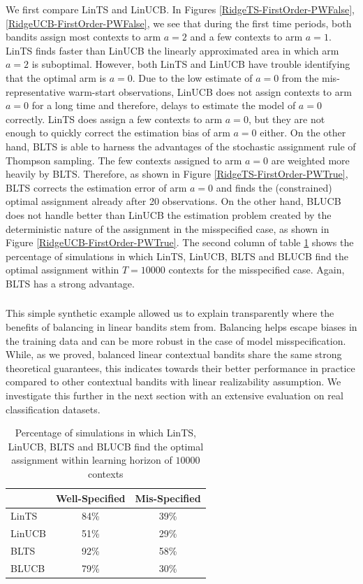 \documentclass[letterpaper]{article} %
\begin{document}
We first compare LinTS and LinUCB.
In Figures \ref{RidgeTS-FirstOrder-PWFalse}, \ref{RidgeUCB-FirstOrder-PWFalse}, we see that during the first time periods, both bandits assign most contexts to arm $a = 2$ and a few contexts to arm $a = 1$. 
LinTS finds faster than LinUCB the linearly approximated area in which arm $a = 2$ is suboptimal. 
However, both LinTS and LinUCB have trouble identifying that the optimal arm is $a = 0$. 
Due to the low estimate of $a = 0$ from the mis-representative warm-start observations, LinUCB does not assign contexts to arm $a = 0$ for a long time and therefore, delays to estimate the model of $a = 0$ correctly. 
LinTS does assign a few contexts to arm $a = 0$, but they are not enough to quickly correct the estimation bias of arm $a = 0$ either. 
On the other hand, BLTS is able to harness the advantages of the stochastic assignment rule of Thompson sampling. 
The few contexts assigned to arm $a = 0$ are weighted more heavily by BLTS. 
Therefore, as shown in Figure \ref{RidgeTS-FirstOrder-PWTrue}, BLTS corrects the estimation error of arm $a = 0$ and finds the (constrained) optimal assignment already after 20 observations. 
On the other hand, BLUCB does not handle better than LinUCB the estimation problem created by the deterministic nature of the assignment in the misspecified case, as shown in Figure \ref{RidgeUCB-FirstOrder-PWTrue}.
The second column of table \ref{RidgeTSUCB-Percentages} shows the percentage of simulations in which LinTS, LinUCB, BLTS and BLUCB find the optimal assignment within $T = 10000$ contexts for the misspecified case.
Again, BLTS has a strong advantage.


\subsubsection{}
This simple synthetic example allowed us to explain transparently where the benefits of balancing in linear bandits stem from. Balancing helps escape biases in the training data and can be more robust in the case of model misspecification. 
While, as we proved, balanced linear contextual bandits share the same strong theoretical guarantees, this indicates towards their better performance in practice compared to other contextual bandits with linear realizability assumption.
We investigate this further in the next section with an extensive evaluation on real classification datasets.


\begin{table}[h]
\centering
\begin{tabular}{l||c||c}
& Well-Specified & Mis-Specified \\
\hline 
LinTS & 84\% & 39\% \\ 
\hline
LinUCB & 51\% & 29\%  \\ 
\hline
{BLTS} & {92\%} & {58\%}  \\ 
\hline
BLUCB & 79\% & 30\% \\
\hline
\end{tabular}
\caption{Percentage of simulations in which LinTS, LinUCB, BLTS and BLUCB find the optimal assignment within learning horizon of $10000$ contexts}
\label{RidgeTSUCB-Percentages}
\end{table}
\end{document}
